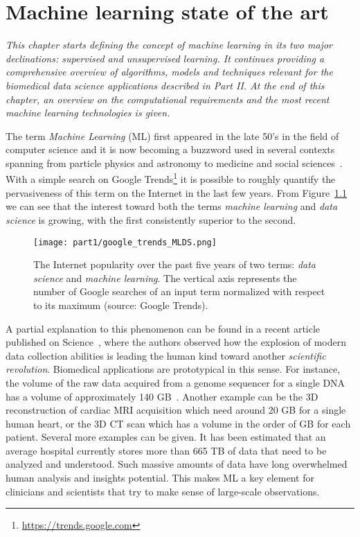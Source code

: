 
\chapter{Machine learning state of the art} \label{chap:state-of-the-art}

\begin{displayquote}
	\textit{This chapter starts defining the concept of machine learning in its two major declinations: supervised and unsupervised learning. It continues providing a comprehensive overview  of algorithms, models and techniques relevant for the biomedical data science applications described in Part II. At the end of this chapter, an overview on the computational requirements and the most recent machine learning technologies is given.}
\end{displayquote}

The term \textit{Machine Learning} (ML) first appeared in the late 50's in the field of computer science and it is now becoming a buzzword used in several contexts spanning from particle physics and astronomy to medicine and social sciences~\cite{service2017ai}.
With a simple search on Google Trends\footnote{\url{https://trends.google.com}} it is possible to roughly quantify the pervasiveness of this term on the Internet in the last few years. From Figure~\ref{fig:google_trend_ML} we can see that the interest toward both the terms \textit{machine learning} and \textit{data science} is growing, with the first consistently superior to the second.

\begin{figure}[h!]
  \centering
    \texttt{[image: part1/google\_trends\_MLDS.png]}
  \caption{The Internet popularity over the past five years of two terms: \textit{data science} and \textit{machine learning}. The vertical axis represents the number of Google searches of an input term normalized with respect to its maximum (source: Google Trends).} \label{fig:google_trend_ML}
\end{figure}

A partial explanation to this phenomenon can be found in a recent article published on Science~\cite{appenzeller2017revolution}, where the authors observed how the explosion of modern data collection abilities is leading the human kind toward another \textit{scientific revolution}.
Biomedical applications are prototypical in this sense. For instance, the volume of the raw data acquired from a genome sequencer for a single \ac{DNA} has a volume of approximately 140 GB~\cite{marx2013biology}. Another example can be the 3D reconstruction of cardiac MRI acquisition which need around 20 GB for a single human heart, or the 3D \ac{CT} scan which has a volume in the order of GB for each patient. Several more examples can be given. It has been estimated that an average hospital currently stores more than 665 TB of data that need to be analyzed and understood.
Such massive amounts of data have long overwhelmed human analysis and insights potential. This makes ML a key element for clinicians and scientists that try to make sense of large-scale observations.

